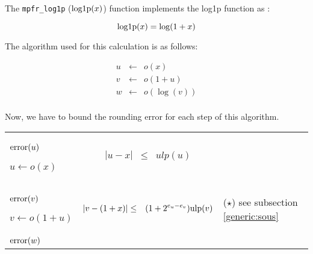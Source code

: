 \documentclass[12pt]{amsart}
\def\n{\textnormal}
\def\ulp{{\rm ulp}}
\begin{document}
The {\tt mpfr\_log1p} ($\n{log1p}(x)$) function implements the log1p function  as :

\[
\textnormal{log1p} (x) = \log(1+x)
\]

The algorithm used for this calculation is as follows:

\begin{eqnarray}\nonumber
u&\leftarrow&o(x)\\\nonumber
v&\leftarrow&o(1+u)\\\nonumber
w&\leftarrow&o(\log(v))\\\nonumber
\end{eqnarray}

Now, we have to bound the rounding error for each step of this
algorithm.  

\begin{center}
\begin{tabular}{l l l}

\begin{minipage}{2.5cm}


${\textnormal{error}}(u)$


$u \leftarrow o(x)$

\end{minipage} &
\begin{minipage}{7.5cm}

\begin{eqnarray}\nonumber
  |u-x| &\leq& ulp(u)\\\nonumber
\end{eqnarray}

\end{minipage} &
\begin{minipage}{6cm}
{\hspace{7cm}}
\end{minipage}\\%
\begin{minipage}{2.5cm}
${\textnormal{error}}(v)$


$v \leftarrow o(1+u) $

\end{minipage} &
\begin{minipage}{7.5cm}

\begin{eqnarray}\nonumber
  |v-(1+x)| &\leq& (1+2^{e_u-e_v})\ulp(v)
\end{eqnarray}


\end{minipage} &
\begin{minipage}{6cm}
($\star$)
see subsection \ref{generic:sous}
\end{minipage}\\%
\begin{minipage}{2.5cm}
${\textnormal{error}}(w)$



\end{minipage}
\end{tabular}
\end{center}
\end{document}
